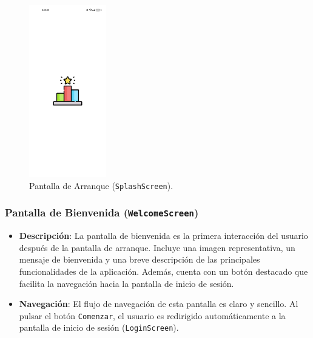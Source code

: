 \documentclass{article}
\begin{document}
\begin{flushleft}
\begin{figure}[H]
    \centering
    \includegraphics[width=0.3\textwidth]{TFG/img/img/splaah.jpeg}
    \caption{Pantalla de Arranque (\texttt{SplashScreen}).}
    \label{fig:splash_screen}
\end{figure}

\clearpage

\subsubsection{Pantalla de Bienvenida (\texttt{WelcomeScreen})}
\begin{itemize}
    \item \textbf{Descripci\'on}: 
    La pantalla de bienvenida es la primera interacci\'on del usuario despu\'es de la pantalla de arranque. Incluye una imagen representativa, un mensaje de bienvenida y una breve descripci\'on de las principales funcionalidades de la aplicaci\'on. Adem\'as, cuenta con un bot\'on destacado que facilita la navegaci\'on hacia la pantalla de inicio de sesi\'on.
    
    \item \textbf{Navegaci\'on}: 
    El flujo de navegaci\'on de esta pantalla es claro y sencillo. Al pulsar el bot\'on \texttt{Comenzar}, el usuario es redirigido autom\'aticamente a la pantalla de inicio de sesi\'on (\texttt{LoginScreen}).


\end{itemize}
\end{flushleft}
\end{document}
